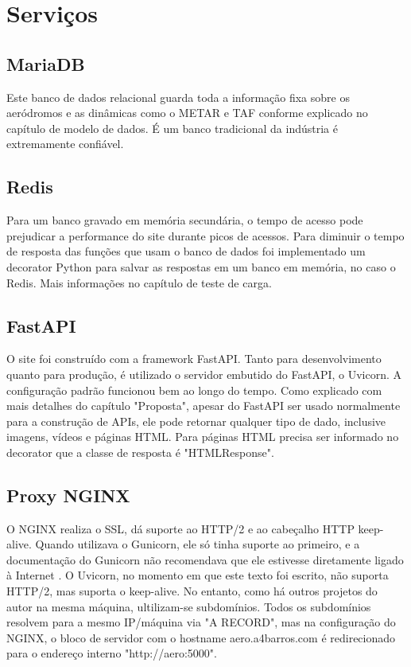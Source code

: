 \section{Serviços}

\subsection{MariaDB}
Este banco de dados relacional guarda toda a informação fixa sobre os aeródromos e as dinâmicas
como o METAR e TAF conforme explicado no capítulo de modelo de dados. É um banco tradicional
da indústria é extremamente confiável.

\subsection{Redis}
Para um banco gravado em memória secundária, o tempo de acesso pode prejudicar a 
performance do site durante picos de acessos. Para diminuir o tempo de resposta das
funções que usam o banco
de dados foi implementado um decorator Python para salvar as respostas em um banco
em memória, no caso o Redis. Mais informações no capítulo de teste de carga.

\subsection{FastAPI}

O site foi construído com a framework FastAPI. Tanto para desenvolvimento quanto para produção, 
é utilizado o servidor embutido do FastAPI, o Uvicorn. A configuração padrão funcionou bem ao
longo do tempo. Como explicado com mais detalhes do capítulo "Proposta", apesar do FastAPI ser
usado normalmente para a construção de APIs, ele pode retornar qualquer tipo de dado, inclusive
imagens, vídeos e páginas HTML. Para páginas HTML precisa ser informado no decorator que a
classe de resposta é "HTMLResponse".



\subsection{Proxy NGINX}
O NGINX realiza o SSL, dá suporte ao HTTP/2 e ao cabeçalho HTTP keep-alive. Quando
utilizava o Gunicorn, ele só tinha suporte ao primeiro, e a documentação do Gunicorn não
recomendava que ele estivesse diretamente ligado à Internet \cite{nginx-gunicorn}. O Uvicorn,
no momento em que este texto foi escrito, não suporta HTTP/2, mas suporta o keep-alive. No
entanto, como há outros projetos do autor na mesma máquina, ultilizam-se subdomínios. Todos os subdomínios
resolvem para a mesmo IP/máquina via "A RECORD", mas na configuração
do NGINX, o bloco de servidor com o hostname aero.a4barros.com é redirecionado para o
endereço interno "http://aero:5000".



